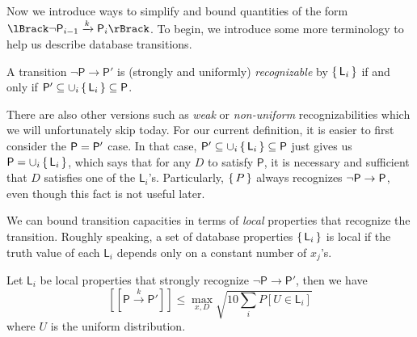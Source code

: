 Now we introduce ways to simplify and bound quantities of the form 
$\lBrack\neg\sfP_{i-1}\xrightarrow{k}\sfP_i\rBrack$.
To begin, we introduce some more terminology to help us describe database transitions.
\begin{defn}[Recognizability]
	A transition $\neg\mathsf{P}\rightarrow\mathsf{P}'$ is (strongly and uniformly) \emph{recognizable}
		by $\set{\mathsf{L}_i}$ if and only if $\mathsf{P}'\subseteq \cup_i\set{\mathsf{L}_i}\subseteq\mathsf{P}$.
\end{defn}

There are also other versions such as \emph{weak} or \emph{non-uniform} recognizabilities which we will unfortunately skip today.
For our current definition, it is easier to first consider the $\mathsf{P}=\mathsf{P}'$ case.
In that case,
$\mathsf{P}'\subseteq \cup_i\set{\mathsf{L}_i}\subseteq\mathsf{P}$
just gives us
$\mathsf{P}=\cup_i\set{\mathsf{L}_i}$,
which says that for any $D$ to satisfy $\mathsf{P}$, it is necessary and sufficient that $D$ satisfies one of the $\mathsf{L}_i$'s.
Particularly, $\set{P}$ always recognizes $\neg\mathsf{P}\rightarrow\mathsf{P}$,
even though this fact is not useful later.

We can bound transition capacities in terms of \emph{local} properties that recognize the transition.
Roughly speaking, a set of database properties $\set{\mathsf{L}_i}$ is local if the truth value of each $\mathsf{L}_i$ depends only on a constant number of $x_j$'s.

\begin{thm}
	\label{property-to-bound}
	Let $\mathsf{L}_i$ be local properties that strongly recognize $\neg\mathsf{P}\rightarrow\mathsf{P}'$, then we have
	$$[\![\mathsf{P}\xrightarrow{k}\mathsf{P}']\!]\leq\max_{x, D}\sqrt{10\sum_iP[U\in\mathsf{L}_i]}$$
	where $U$ is the uniform distribution.
\end{thm}

